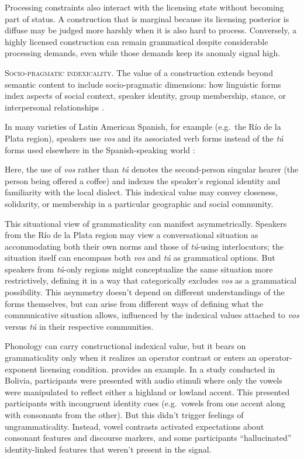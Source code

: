 \documentclass[12pt,letterpaper]{article}
\newcommand{\olang}[1]{\textit{#1}}
\begin{document}
Processing constraints also interact with the licensing state without becoming part of status. A construction that is marginal because its licensing posterior is diffuse may be judged more harshly when it is also hard to process. Conversely, a highly licensed construction can remain grammatical despite considerable processing demands, even while those demands keep its anomaly signal high.

\noindent\textsc{Socio-pragmatic indexicality.} The value of a construction extends beyond semantic content to include socio-pragmatic dimensions: how linguistic forms index aspects of social context, speaker identity, group membership, stance, or interpersonal relationships \autocite{Eckert2012, Silverstein1976}.

In many varieties of Latin American Spanish, for example (e.g.\, the Río de la Plata region), speakers use \olang{vos} and its associated verb forms instead of the \olang{tú} forms used elsewhere in the Spanish-speaking world \autocite{bertolotti2016}:

\z

Here, the use of \olang{vos} rather than \olang{tú} denotes the second-person singular hearer (the person being offered a coffee) and indexes the speaker's regional identity and familiarity with the local dialect. This indexical value may convey closeness, solidarity, or membership in a particular geographic and social community.

This situational view of grammaticality can manifest asymmetrically. Speakers from the Río de la Plata region may view a conversational situation as accommodating both their own norms and those of \olang{tú}-using interlocutors; the situation itself can encompass both \olang{vos} and \olang{tú} as grammatical options. But speakers from \olang{tú}-only regions might conceptualize the same situation more restrictively, defining it in a way that categorically excludes \olang{vos} as a grammatical possibility. This asymmetry doesn't depend on different understandings of the forms themselves, but can arise from different ways of defining what the communicative situation allows, influenced by the indexical values attached to \olang{vos} versus \olang{tú} in their respective communities.

Phonology can carry constructional indexical value, but it bears on grammaticality only when it realizes an operator contrast or enters an operator-exponent licensing condition. \textcite{Babel2025} provides an example. In a study conducted in Bolivia, participants were presented with audio stimuli where only the vowels were manipulated to reflect either a highland or lowland accent. This presented participants with incongruent identity cues (e.g.\, vowels from one accent along with consonants from the other). But this didn't trigger feelings of ungrammaticality. Instead, vowel contrasts activated expectations about consonant features and discourse markers, and some participants \enquote{hallucinated} identity-linked features that weren't present in the signal.
\end{document}
